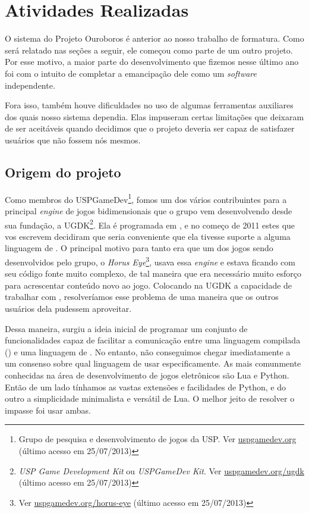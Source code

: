 \def\classname#1{\texttt{#1}}

\chapter{Atividades Realizadas}
\label{sec:atividades}

O sistema do Projeto Ouroboros é anterior ao nosso trabalho de formatura. Como
será relatado nas seções a seguir, ele começou como parte de um outro projeto.
Por esse motivo, a maior parte do desenvolvimento que fizemos nesse último ano
foi com o intuito de completar a emancipação dele como um \emph{software}
independente.

Fora isso, também houve dificuldades no uso de algumas ferramentas auxiliares
dos quais nosso sistema dependia. Elas impuseram certas limitações que deixaram
de ser aceitáveis quando decidimos que o projeto deveria ser capaz de satisfazer
usuários que não fossem nós mesmos.

\section{Origem do projeto}
\label{sec:atividades:origem}

Como membros do USPGameDev\footnote{Grupo de pesquisa e desenvolvimento de jogos
da USP. Ver \url{uspgamedev.org} (último acesso em 25/07/2013)},
fomos um dos vários contribuintes para a principal \emph{engine} de jogos
bidimensionais que o grupo vem desenvolvendo desde sua fundação, a
UGDK\footnote{\emph{USP Game Development Kit} ou \emph{USPGameDev Kit}. Ver
\url{uspgamedev.org/ugdk} (último acesso em 25/07/2013)}. Ela é programada em
\CXX{}, e no começo de 2011 estes que vos escrevem decidiram que seria
conveniente que ela tivesse suporte a alguma linguagem de \script{}. O principal
motivo para tanto era que um dos jogos sendo desenvolvidos pelo grupo, o
\emph{Horus Eye}\footnote{Ver \url{uspgamedev.org/horus-eye} (último acesso em
25/07/2013)}, usava essa \emph{engine} e estava ficando com seu código fonte
muito complexo, de tal maneira que era necessário muito esforço para acrescentar
conteúdo novo ao jogo. Colocando na UGDK a capacidade de trabalhar com
, resolveríamos esse problema de uma maneira que os outros usuários
dela pudessem aproveitar.

Dessa maneira, surgiu a ideia inicial de programar um conjunto de
funcionalidades capaz de facilitar a comunicação entre uma linguagem compilada
(\CXX{}) e uma linguagem de \script{}. No entanto, não conseguimos chegar
imediatamente a um consenso sobre qual linguagem de \script{} usar
especificamente. As mais comunmente conhecidas na área de desenvolvimento de
jogos eletrônicos são Lua e Python. Então de um lado tínhamos as vastas
extensões e facilidades de Python, e do outro a simplicidade minimalista e
versátil de Lua. O melhor jeito de resolver o impasse foi usar ambas.

